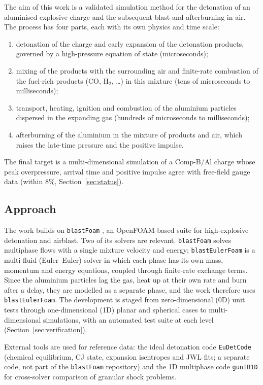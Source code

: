 \documentclass{article}
\begin{document}
The aim of this work is a validated simulation method for the detonation of an aluminised explosive charge and the subsequent blast and afterburning in air. The process has four parts, each with its own physics and time scale:
\begin{enumerate}
    \item detonation of the charge and early expansion of the detonation products, governed by a high-pressure equation of state (microseconds);
    \item mixing of the products with the surrounding air and finite-rate combustion of the fuel-rich products (CO, H$_2$, \dots) in this mixture (tens of microseconds to milliseconds);
    \item transport, heating, ignition and combustion of the aluminium particles dispersed in the expanding gas (hundreds of microseconds to milliseconds);
    \item afterburning of the aluminium in the mixture of products and air, which raises the late-time pressure and the positive impulse.
\end{enumerate}
The final target is a multi-dimensional simulation of a Comp-B/Al charge whose peak overpressure, arrival time and positive impulse agree with free-field gauge data (within 8\%, Section~\ref{sec:status}).

\subsection{Approach}

The work builds on \texttt{blastFoam} \cite{synthetik}, an OpenFOAM-based suite for high-explosive detonation and airblast. Two of its solvers are relevant. \texttt{blastFoam} solves multiphase flows with a single mixture velocity and energy; \texttt{blastEulerFoam} is a multi-fluid (Euler--Euler) solver in which each phase has its own mass, momentum and energy equations, coupled through finite-rate exchange terms. Since the aluminium particles lag the gas, heat up at their own rate and burn after a delay, they are modelled as a separate phase, and the work therefore uses \texttt{blastEulerFoam}. The development is staged from zero-dimensional (0D) unit tests through one-dimensional (1D) planar and spherical cases to multi-dimensional simulations, with an automated test suite at each level (Section~\ref{sec:verification}).

External tools are used for reference data: the ideal detonation code \texttt{EuDetCode} (chemical equilibrium, CJ state, expansion isentropes and JWL fits; a separate code, not part of the \texttt{blastFoam} repository) and the 1D multiphase code \texttt{gunIB1D} for cross-solver comparison of granular shock problems.
\end{document}
